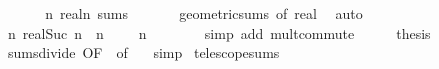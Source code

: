 \begin{isabellebody}
%
\isadelimproof
%
\endisadelimproof
%
\isatagproof
{}\isamarkupfalse%
\ {\isacharminus}{\kern0pt}\isanewline
\ \ \isamarkupfalse%
\ {}{\isacharcolon}{\kern0pt}\ {\isachardoublequoteopen}{\isacharparenleft}{\kern0pt}{\isasymlambda}n{\isachardot}{\kern0pt}\ {\isacharparenleft}{\kern0pt}{}{\isacharslash}{\kern0pt}{}{\isacharcolon}{\kern0pt}{\isacharcolon}{\kern0pt}real{\isacharparenright}{\kern0pt}{\isacharcircum}{\kern0pt}n{\isacharparenright}{\kern0pt}\ sums\ {}{\isachardoublequoteclose}\isanewline
\ \ \ \ \isamarkupfalse%
\ geometric{\isacharunderscore}{\kern0pt}sums\ {\isacharbrackleft}{\kern0pt}of\ {\isachardoublequoteopen}{}{\isacharslash}{\kern0pt}{}{\isacharcolon}{\kern0pt}{\isacharcolon}{\kern0pt}real{\isachardoublequoteclose}{\isacharbrackright}{\kern0pt}\ \isamarkupfalse%
\ auto\isanewline
\ \ \isamarkupfalse%
\ {\isachardoublequoteopen}{\isacharparenleft}{\kern0pt}{\isasymlambda}n{\isachardot}{\kern0pt}\ {\isacharparenleft}{\kern0pt}{}{\isacharslash}{\kern0pt}{}{\isacharcolon}{\kern0pt}{\isacharcolon}{\kern0pt}real{\isacharparenright}{\kern0pt}{\isacharcircum}{\kern0pt}Suc\ n{\isacharparenright}{\kern0pt}\ {\isacharequal}{\kern0pt}\ {\isacharparenleft}{\kern0pt}{\isasymlambda}n{\isachardot}{\kern0pt}\ {\isacharparenleft}{\kern0pt}{}\ {\isacharslash}{\kern0pt}\ {}{\isacharparenright}{\kern0pt}\ {\isacharcircum}{\kern0pt}\ n\ {\isacharslash}{\kern0pt}\ {}{\isacharparenright}{\kern0pt}{\isachardoublequoteclose}\isanewline
\ \ \ \ \isamarkupfalse%
\ {\isacharparenleft}{\kern0pt}simp\ add{\isacharcolon}{\kern0pt}\ mult{\isachardot}{\kern0pt}commute{\isacharparenright}{\kern0pt}\isanewline
\ \ \isamarkupfalse%
\ \isamarkupfalse%
\ {\isacharquery}{\kern0pt}thesis\isanewline
\ \ \ \ \isamarkupfalse%
\ sums{\isacharunderscore}{\kern0pt}divide\ {\isacharbrackleft}{\kern0pt}OF\ {}{\isacharcomma}{\kern0pt}\ of\ {}{\isacharbrackright}{\kern0pt}\ \isamarkupfalse%
\ simp\isanewline
{}\isamarkupfalse%
%
\endisatagproof
{\isafoldproof}%
%
\isadelimproof
%
\endisadelimproof
%
\isadelimdocument
%
\endisadelimdocument
%
\isatagdocument
%
\isamarkuptrue%
%
\endisatagdocument
{\isafolddocument}%
%
\isadelimdocument
%
\endisadelimdocument
{}\isamarkupfalse%
\ telescope{\isacharunderscore}{\kern0pt}sums{\isacharcolon}{\kern0pt}\isanewline

\end{isabellebody}
